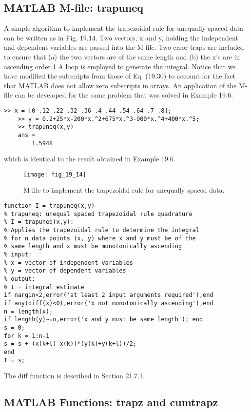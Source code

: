 \documentclass[../main.tex]{subfiles}
\begin{document}
\subsection{MATLAB M-file: trapuneq}
A simple algorithm to implement the trapezoidal rule for unequally spaced data can be
written as in Fig. 19.14. Two vectors, x and y, holding the independent and dependent variables are passed into the M-file. Two error traps are included to ensure that (a) the two vectors are of the same length and (b) the x's are in ascending order.1 A loop is employed to
generate the integral. Notice that we have modified the subscripts from those of Eq. (19.30)
to account for the fact that MATLAB does not allow zero subscripts in arrays.
An application of the M-file can be developed for the same problem that was solved in
Example 19.6:
\begin{lstlisting}[numbers=none]
	>> x = [0 .12 .22 .32 .36 .4 .44 .54 .64 .7 .8];
	>> y = 0.2+25*x-200*x.^2+675*x.^3-900*x.^4+400*x.^5;
	>> trapuneq(x,y)
	ans =
		1.5948
\end{lstlisting}
which is identical to the result obtained in Example 19.6.

\begin{figure}[H]
    \centering
    \texttt{[image: fig\_19\_14]}
   \caption{\textsf{M-file to implement the trapezoidal rule for unequally spaced data.}}\label{fig:fig_19_14}
\end{figure}

\begin{lstlisting}[numbers=none]
function I = trapuneq(x,y)
% trapuneq: unequal spaced trapezoidal rule quadrature
% I = trapuneq(x,y):
% Applies the trapezoidal rule to determine the integral
% for n data points (x, y) where x and y must be of the
% same length and x must be monotonically ascending
% input:
% x = vector of independent variables
% y = vector of dependent variables
% output:
% I = integral estimate
if nargin<2,error('at least 2 input arguments required'),end
if any(diff(x)<0),error('x not monotonically ascending'),end
n = length(x);
if length(y)~=n,error('x and y must be same length'); end
s = 0;
for k = 1:n-1
s = s + (x(k+l)-x(k))*(y(k)+y(k+l))/2;
end
I = s; 
\end{lstlisting}
The diff function is described in Section 21.7.1.

\subsection{ MATLAB Functions: trapz and cumtrapz}
\end{document}
